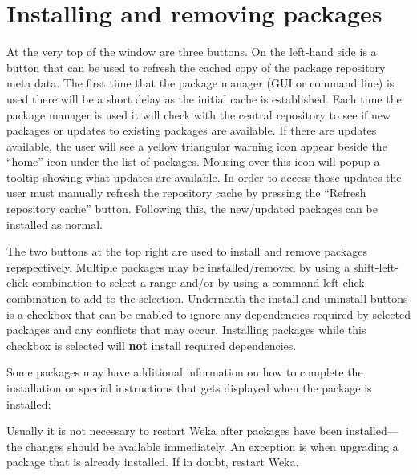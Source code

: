 \begin{center}
\end{center}

\section{Installing and removing packages}

At the very top of the window are three buttons. On the left-hand side
is a button that can be used to refresh the cached copy of the package
repository meta data. The first time that the package manager (GUI or
command line) is used there will be a short delay as the initial cache
is established. Each time the package manager is used it will check 
with the central repository to see if new packages or updates to 
existing packages are available. If there are updates available, the
user will see a yellow triangular warning icon appear beside the 
``home'' icon under the list of packages. Mousing over this icon will
popup a tooltip showing what updates are available. In order to access
those updates the user must manually refresh the repository cache by 
pressing the ``Refresh repository cache'' button. Following this, the
new/updated packages can be installed as normal.

The two buttons at the top right are used to install and remove
packages repspectively. Multiple packages may be installed/removed by
using a shift-left-click combination to select a range and/or by using
a command-left-click combination to add to the selection. Underneath
the install and uninstall buttons is a checkbox that can be enabled to
ignore any dependencies required by selected packages and any
conflicts that may occur. Installing packages while this checkbox is
selected will \textbf{not} install required dependencies.

Some packages may have additional information on how to complete the
installation or special instructions that gets displayed when the
package is installed:

\begin{center}
\end{center}

Usually it is not necessary to restart Weka after packages have been
installed---the changes should be available immediately. An exception
is when upgrading a package that is already installed. If in doubt, 
restart Weka.


